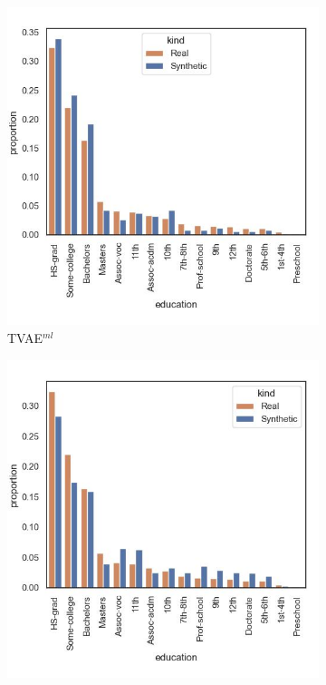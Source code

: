 \begin{figure}[t]
	\centering
	\begin{subfigure}{0.32\textwidth}
		\centering
		\includegraphics[width=\textwidth]{images/dist_education/tvae.jpg}
		\caption{TVAE$^{ml}$}
	\end{subfigure}
	\begin{subfigure}{0.32\textwidth}
		\centering
		\includegraphics[width=\textwidth]{images/dist_education/ctabgan.jpg}

\end{subfigure}
\end{figure}
